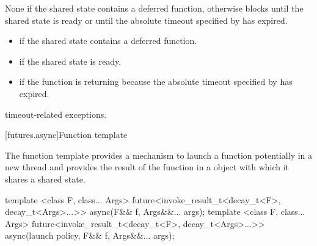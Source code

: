 \begin{itemdescr}
\pnum
\effects
None if the shared state contains a deferred function,
otherwise
blocks until the shared state is ready or until the
absolute timeout specified by
 has expired.

\pnum
\returns

\begin{itemize}
\item {} if the shared state contains a deferred
function.

\item {} if the shared state is ready.

\item {} if the function is returning because the
absolute timeout
specified by  has expired.
\end{itemize}

\pnum
\throws
timeout-related exceptions.
\end{itemdescr}

[futures.async]{Function template }

\pnum
The function template  provides a mechanism to launch a function potentially
in a new thread and provides the result of the function in a  object with which
it shares a shared state.

%
\begin{itemdecl}
template <class F, class... Args>
  future<invoke_result_t<decay_t<F>, decay_t<Args>...>>
    async(F&& f, Args&&... args);
template <class F, class... Args>
  future<invoke_result_t<decay_t<F>, decay_t<Args>...>>
    async(launch policy, F&& f, Args&&... args);
\end{itemdecl}

